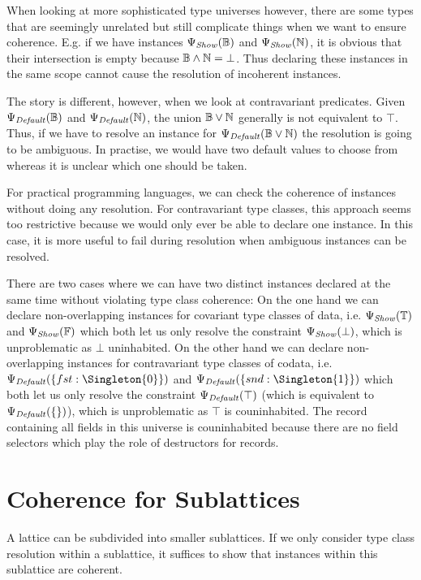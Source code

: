 When looking at more sophisticated type universes however, there are some types that are seemingly unrelated but still complicate things when we want to ensure coherence.
E.g. if we have instances $\Psi_\mathit{Show}(\mathbb{B})$ and $\Psi_\mathit{Show}(\mathbb{N})$, it is obvious that their intersection is empty  because $\mathbb{B} \wedge \mathbb{N} = \bot$.
Thus declaring these instances in the same scope cannot cause the resolution of incoherent instances.

The story is different, however, when we look at contravariant predicates.
Given $\Psi_\mathit{Default}(\mathbb{B})$ and $\Psi_\mathit{Default}(\mathbb{N})$, the union $\mathbb{B} \vee \mathbb{N}$ generally is not equivalent to $\top$. %
Thus, if we have to resolve an instance for $\Psi_\mathit{Default}(\mathbb{B} \vee \mathbb{N})$ the resolution is going to be ambiguous.
In practise, we would have two default values to choose from whereas it is unclear which one should be taken.

For practical programming languages, we can check the coherence of instances without doing any resolution.
For contravariant type classes, this approach seems too restrictive because we would only ever be able to declare one instance.
In this case, it is more useful to fail during resolution when ambiguous instances can be resolved.

There are two cases where we can have two distinct instances declared at the same time without violating type class coherence:
On the one hand we can declare non-overlapping instances for covariant type classes of data, i.e. $\Psi_\mathit{Show}(\mathbb{T})$ and $\Psi_\mathit{Show}(\mathbb{F})$ which both let us only resolve the constraint $\Psi_\mathit{Show}(\bot)$, which is unproblematic as $\bot$ uninhabited.
On the other hand we can declare non-overlapping instances for contravariant type classes of codata, i.e. $\Defaultable(\{fst : \Singleton{0}\})$ and $\Defaultable(\{snd : \Singleton{1}\})$ which both let us only resolve the constraint $\Psi_\mathit{Default}(\top)$ (which is equivalent to $\Psi_\mathit{Default}(\{\})$), which is unproblematic as $\top$ is  couninhabited.
The record containing all fields in this universe is couninhabited because there are no field selectors which play the role of destructors for records.


\section{Coherence for Sublattices}

A lattice can be subdivided into smaller sublattices.
If we only consider type class resolution within a sublattice, it suffices to show that instances within this sublattice are coherent.

